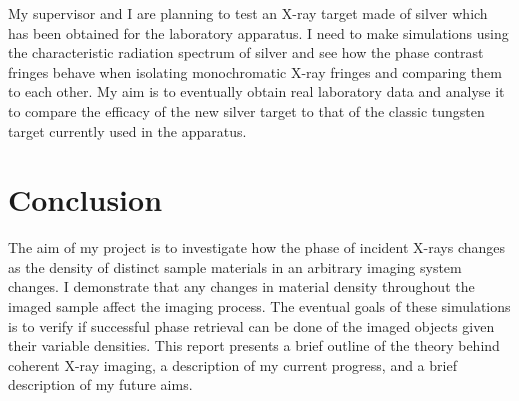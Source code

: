 \documentclass[9pt, a4paper]{article}
\begin{document}
My supervisor and I are planning to test an X-ray target made of silver which has been obtained for the laboratory apparatus. I need to make simulations using the characteristic radiation spectrum of silver and see how the phase contrast fringes behave when isolating monochromatic X-ray fringes and comparing them to each other. My aim is to eventually obtain real laboratory data and analyse it to compare the efficacy of the new silver target to that of the classic tungsten target currently used in the apparatus.

\section{Conclusion}
The aim of my project is to investigate how the phase of incident X-rays changes as the density of distinct sample materials in an arbitrary imaging system changes. I demonstrate that any changes in material density throughout the imaged sample affect the imaging process. The eventual goals of these simulations is to verify if successful phase retrieval can be done of the imaged objects given their variable densities. This report presents a brief outline of the theory behind coherent X-ray imaging, a description of my current progress, and a brief description of my future aims.



\end{document}
